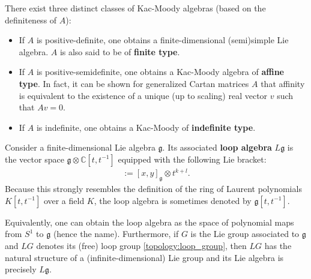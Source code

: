     \begin{remark}[Classification]
        There exist three distinct classes of Kac-Moody algebras (based on the definiteness of $A$):
        \begin{itemize}
            \item If $A$ is positive-definite, one obtains a finite-dimensional (semi)simple Lie algebra. $A$ is also said to be of \textbf{finite type}.
            \item If $A$ is positive-semidefinite, one obtains a Kac-Moody algebra of \textbf{affine type}. In fact, it can be shown for generalized Cartan matrices $A$ that affinity is equivalent to the existence of a unique (up to scaling) real vector $v$ such that $Av=0$.
            \item If $A$ is indefinite, one obtains a Kac-Moody of \textbf{indefinite type}.
        \end{itemize}
    \end{remark}

    \begin{definition}
        Consider a finite-dimensional Lie algebra $\mathfrak{g}$. Its associated \textbf{loop algebra} $L\mathfrak{g}$ is the vector space $\mathfrak{g}\otimes\mathbb{C}[t,t^{-1}]$ equipped with the following Lie bracket:
        \begin{gather}
            [x\otimes t^k,y\otimes t^l] := [x,y]_\mathfrak{g}\otimes t^{k+l}.
        \end{gather}
        Because this strongly resembles the definition of the ring of Laurent polynomials $K[t,t^{-1}]$ over a field $K$, the loop algebra is sometimes denoted by $\mathfrak{g}[t,t^{-1}]$.

        Equivalently, one can obtain the loop algebra as the space of polynomial maps from $S^1$ to $\mathfrak{g}$ (hence the name). Furthermore, if $G$ is the Lie group associated to $\mathfrak{g}$ and $LG$ denotes its (free) loop group \ref{topology:loop_group}, then $LG$ has the natural structure of a (infinite-dimensional) Lie group and its Lie algebra is precisely $L\mathfrak{g}$.
    \end{definition}

